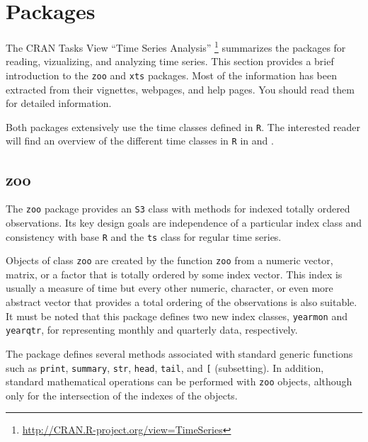 \documentclass[smallroyalvopaper]{memoir}
\begin{document}
\section{Packages}
\label{sec:org8069185}
\label{sec:time-series-packages}

The CRAN Tasks View ``Time Series Analysis'' \footnote{\url{http://CRAN.R-project.org/view=TimeSeries}} summarizes the packages for reading, vizualizing, and analyzing time series. This section provides a brief introduction to the \texttt{zoo} and \texttt{xts} packages. Most of the information has been extracted from their vignettes, webpages, and help pages. You should read them for detailed information.

Both packages extensively use the time classes defined in \texttt{R}. The interested reader will find an overview of the different time classes in \texttt{R} in \cite{Ripley.Hornik2001} and \cite{Grothendieck.Petzoldt2004}.

\subsection{zoo}
\label{sec:orgbb4f3f9}
\label{sec:zoo}

The \texttt{zoo} package \cite{Zeileis.Grothendieck2005} provides an \texttt{S3} class with methods for indexed totally ordered observations. Its key design goals are independence of a particular index class and consistency with base \texttt{R} and the \texttt{ts} class for regular time series.


Objects of class \texttt{zoo} are created by the function \texttt{zoo} from a numeric vector, matrix, or a factor that is totally ordered by some index vector. This index is usually a measure of time but every other numeric, character, or even more abstract vector that provides a total ordering of the observations is also suitable. It must be noted that this package defines two new index classes, \texttt{yearmon} and \texttt{yearqtr}, for representing monthly and quarterly data, respectively.

The package defines several methods associated with standard generic functions such as \texttt{print}, \texttt{summary}, \texttt{str}, \texttt{head}, \texttt{tail}, and \texttt{[} (subsetting). In addition, standard mathematical operations can be performed with \texttt{zoo} objects, although only for the intersection of the indexes of the objects.
\end{document}
